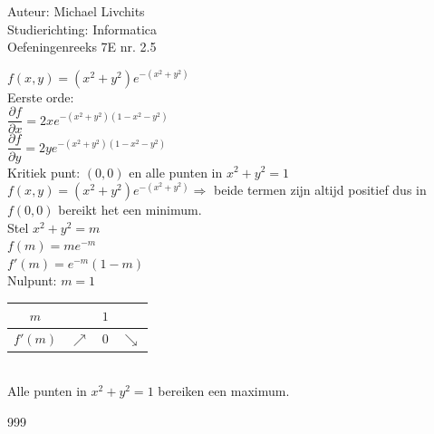 \documentclass[a4paper]{article}
\begin{document}
  
\noindent \large Auteur: Michael Livchits \\
\noindent \large Studierichting: Informatica\\
\noindent \large Oefeningenreeks 7E nr. 2.5\\

\medskip

\normalsize

$f(x,y)= (x^2+y^2)e^{-(x^2+y^2)}$\\
	
Eerste orde:\\
	
$\dfrac{\partial f}{\partial x} = 2xe^{-(x^2+y^2)(1-x^2-y^2)}$\\
	
$\dfrac{\partial f}{\partial y} = 2ye^{-(x^2+y^2)(1-x^2-y^2)}$\\

Kritiek punt: $(0,0)$ en alle punten in $x^2+y^2 = 1$\\

$f(x,y)= (x^2+y^2)e^{-(x^2+y^2)} \Rightarrow$ beide termen zijn altijd positief dus in $f(0,0)$ bereikt het een minimum.\\

Stel $x^2 + y^2 = m$\\

$f(m) = me^{-m}$\\

$f'(m) = e^{-m}(1-m)$\\

Nulpunt: $m = 1$\\

\begin{tabular}{c|ccc}
$m$     & & $1$ &\\ \hline
$f'(m)$ &$\nearrow$& $0$ &$\searrow$ \\
\end{tabular}\\

Alle punten in $x^2+y^2 = 1$ bereiken een maximum.\\

\begin{thebibliography}{999}
\end{thebibliography}
\end{document}

